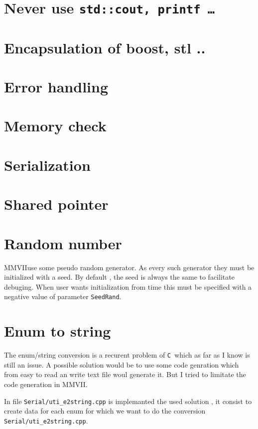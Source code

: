 \documentclass[a4paper]{book}
\newcommand{\CPP}{\mbox{\tt C\hspace{-0.05cm}\raisebox{0.2ex}{\small ++} }}
\newcommand{\PPP}{MMVII}
\begin{document}
\section{Never use {\tt std::cout, printf \dots}}

\section{Encapsulation of boost, stl ..}
\section{Error handling}
\section{Memory check}
\section{Serialization}
\section{Shared pointer}

\section{Random number}

\PPP use some pseudo random generator. As every such generator
they must be initialized with a seed.
By default , the seed is always the same to facilitate debuging.
When user wants initialization from time this must be specified 
with a negative value of parameter {\tt  SeedRand}.



\section{Enum to string}

The enum/string  conversion is a recurent problem of \CPP which
as far as I know is still an issue. A possible solution
would be to use some code genration which from easy to read
an write text file woul generate it. But I tried to limitate
the code generation in \PPP.

In file {\tt Serial/uti\_e2string.cpp} is implemanted 
the used solution , it consist  to create data for each enum
for which we want to do the conversion {\tt Serial/uti\_e2string.cpp}.
\end{document}
